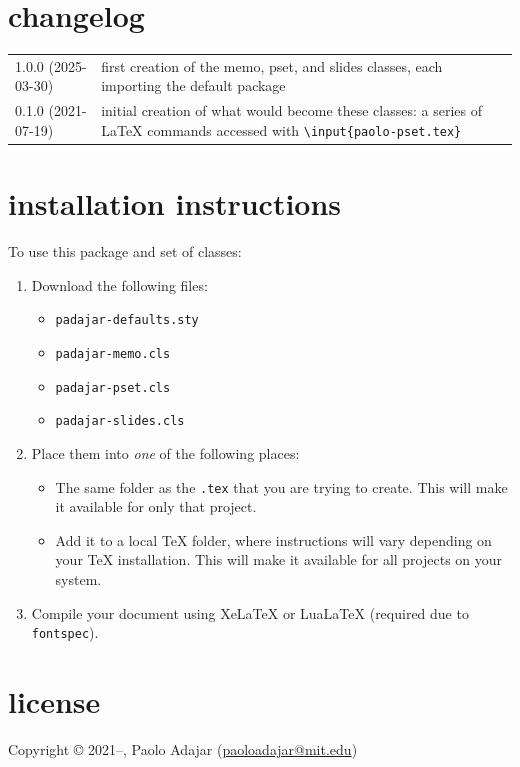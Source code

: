 \documentclass[11pt]{padajar-memo}
\newcommand{\ttslash}[1]{\texttt{\textbackslash #1}}
\begin{document}
\section{changelog}


\begin{tabular}{T p{\textwidth-1.75in}}
	1.0.0 (2025-03-30) & first creation of the memo, pset, and slides classes, each importing the default package  \\
	0.1.0 (2021-07-19) & initial creation of what would become these classes: a series of \LaTeX{} commands accessed with \ttslash{input\{paolo-pset.tex\}}
\end{tabular}


\section{installation instructions}

To use this package and set of classes:

\begin{enumerate}
	\item Download the following files:
	\begin{itemize}
		\item \texttt{padajar-defaults.sty}
		\item \texttt{padajar-memo.cls}
		\item \texttt{padajar-pset.cls}
		\item \texttt{padajar-slides.cls}
	\end{itemize}
	\item Place them into \textit{one} of the following places:
	\begin{itemize}
		\item The same folder as the \texttt{.tex} that you are trying to create. This will make it available for only that project.
		\item Add it to a local \TeX{} folder, where instructions will vary depending on your \TeX{} installation. This will make it available for all projects on your system.
	\end{itemize}
	\item Compile your document using XeLaTeX or LuaLaTeX (required due to \texttt{fontspec}).
\end{enumerate}

\section{license\label{license}}
Copyright \copyright{} 2021--\the\year{}, Paolo Adajar (\href{mailto:paoloadajar@mit.edu}{paoloadajar@mit.edu})
\end{document}
